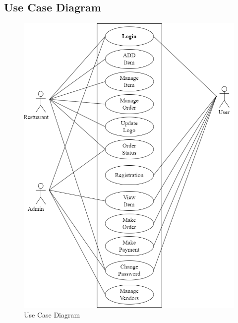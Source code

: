 \subsection{Use Case Diagram}
\begin{figure}[h]
    \includegraphics[scale=0.5]{img/Graphics/useCase.drawio.png}
    \caption{Use Case Diagram}
\end{figure}

\newpage
